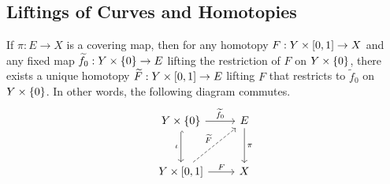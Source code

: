 \documentclass[../Moduli_Spaces_of_Riemann_Surfaces.tex]{subfiles}
\begin{document}
    \subsection{Liftings of Curves and Homotopies}
    \begin{proposition}
        If $\pi:E\to X$ is a covering map, then for any homotopy $F:Y\times\left[0,1\right]\to X$ and any fixed map $\widetilde{f}_0:Y\times\left\{0\right\}\to E$ lifting the restriction of $F$ on $Y\times\left\{0\right\}$, there exists a unique homotopy $\widetilde{F}:Y\times\left[0,1\right]\to E$ lifting $F$ that restricts to $\widetilde{f}_0$ on $Y\times\left\{0\right\}$. In other words, the following diagram commutes.
        \begin{equation*}
            \begin{tikzcd}[row sep=0.4in]
                Y\times\l\{0\r\} \ar[r, "\widetilde{f}_0"] \ar[d, "\iota"', hookrightarrow] & E \ar[d, "\pi"] \\
                Y\times\l[0,1\r] \ar[r, "F"] \ar[ur, "\widetilde{F}", dashed] & X
            \end{tikzcd}
        \end{equation*}
    \end{proposition}
\end{document}
